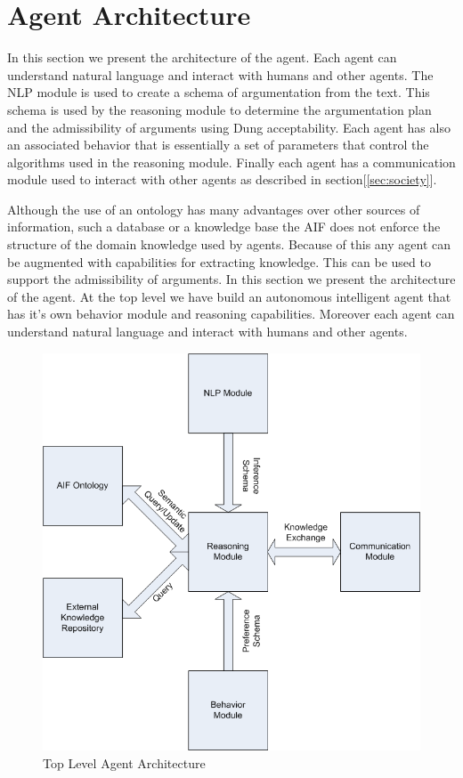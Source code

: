 \section{Agent Architecture}
\label{sec:application}

In this section we present the architecture of the agent. Each agent can understand natural language and interact with humans and other agents. The NLP module is used to create a schema of argumentation from the text. This schema is used by the reasoning module to determine the argumentation plan and the admissibility of arguments using Dung acceptability\cite{dung}. Each agent has also an associated behavior that is essentially a set of parameters that control the algorithms used in the reasoning module. Finally each agent has a communication module used to interact with other agents as described in section[\ref{sec:society}].
\par
Although the use of an ontology has many advantages over other sources of information, such a database or a knowledge base the AIF does not enforce the structure of the domain knowledge used by agents. Because of this any agent can be augmented with capabilities for extracting knowledge. This can be used to support the admissibility of arguments.
In this section we present the architecture of the agent. At the top level we have build an autonomous intelligent agent that has it's own behavior module and reasoning capabilities. Moreover each agent can understand natural language and interact with humans and other agents.

\begin{figure}[t]
\centering
\includegraphics[scale=0.47]{TopLevelAgentStructure}
\caption{Top Level Agent Architecture}
\label{fig:arch}
\end{figure}


